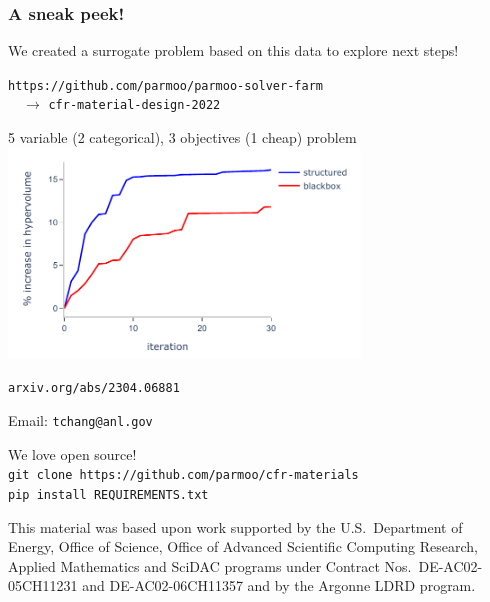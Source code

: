 \documentclass[aspectratio=169]{beamer}
\begin{document}
\begin{frame}
\frametitle{A sneak peek!}

  We created a surrogate problem based on this data to explore next steps!

  \medskip

  {\tt https://github.com/parmoo/parmoo-solver-farm}\\
  $\quad\rightarrow$ {\tt cfr-material-design-2022}\\

  \medskip

  \begin{center}
  5 variable (2 categorical), 3 objectives (1 cheap) problem\\
  \includegraphics[width=0.7\textwidth]{../../img/probs/cfr-new-hypervol.pdf}
  \end{center}

  \medskip

  {\tt arxiv.org/abs/2304.06881}
  
\end{frame}

\begin{frame}[plain]

  \begin{center}
  Email: {\tt tchang@anl.gov}\\

  \bigskip

  {\color{red} We love open source!}\\

  {\tt git clone https://github.com/parmoo/cfr-materials\\
  pip install REQUIREMENTS.txt}

  \bigskip

  {\small

    This material was based upon work supported by the U.S.\ Department of
    Energy, Office of Science, Office of Advanced Scientific Computing
    Research, Applied Mathematics and SciDAC programs under Contract Nos.\
    DE-AC02-05CH11231 and DE-AC02-06CH11357 
    and by the Argonne LDRD program.     

  }
  \end{center}
\end{frame}
\end{document}
